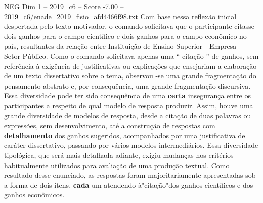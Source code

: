 \begin{textsample}{NEG Dim 1 – 2019\_c6 – Score -7.00 – 2019\_c6/enade\_2019\_fisio\_afd4466f98.txt}
Com base nessa reflexão inicial despertada pelo texto motivador, o comando solicitava que o participante citasse dois ganhos para o campo científico e dois ganhos para o campo econômico no país, resultantes da relação entre Instituição de Ensino Superior - Empresa - Setor Público.
Como o comando solicitava apenas uma “ citação ” de ganhos, sem referência à exigência de justificativas ou explicações que ensejariam a elaboração de um texto dissertativo sobre o tema, observou -se uma grande fragmentação do pensamento abstrato e, por consequência, uma grande fragmentação discursiva.
Essa diversidade pode ter sido consequência de uma \textbf{certa} insegurança entre os participantes a respeito de qual modelo de resposta produzir.
Assim, houve uma grande diversidade de modelos de resposta, desde a citação de duas palavras ou expressões, sem desenvolvimento, até a construção de respostas com \textbf{detalhamento} dos ganhos sugeridos, acompanhados por uma justificativa de caráter dissertativo, passando por vários modelos intermediários.
Essa diversidade tipológica, que será mais detalhada adiante, exigiu mudanças nos critérios habitualmente utilizados para avaliação de uma produção textual.
Como resultado desse enunciado, as respostas foram majoritariamente apresentadas sob a forma de dois itens, \textbf{cada} um atendendo à"citação"dos ganhos científicos e dos ganhos econômicos.

\end{textsample}
